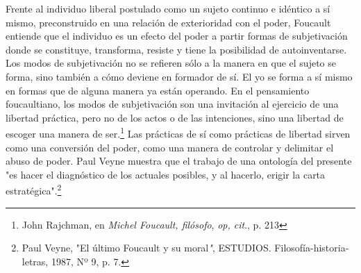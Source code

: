 \documentclass{book}
\begin{document}
Frente al individuo liberal postulado como un sujeto continuo e idéntico
a sí mismo, preconstruido en una relación de exterioridad con el poder,
Foucault entiende que el individuo es un efecto del poder a partir
formas de subjetivación donde se constituye, transforma, resiste y tiene
la posibilidad de autoinventarse. Los modos de subjetivación no se
refieren sólo a la manera en que el sujeto se forma, sino también a cómo
deviene en formador de sí. El yo se forma a sí mismo en formas que de
alguna manera ya están operando. En el pensamiento foucaultiano, los
modos de subjetivación son una invitación al ejercicio de una libertad
práctica, pero no de los actos o de las intenciones, sino una libertad
de escoger una manera de ser.\footnote{John Rajchman, en \emph{Michel
  Foucault, filósofo}, \emph{op, cit}., p. 213} Las prácticas de sí como
prácticas de libertad sirven como una conversión del poder, como una
manera de controlar y delimitar el abuso de poder. Paul Veyne muestra
que el trabajo de una ontología del presente "es hacer el diagnóstico de
los actuales posibles, y al hacerlo, erigir la carta
estratégica".\footnote{Paul Veyne, "El último Foucault y su
  moral\emph{"}, ESTUDIOS. Filosofía-historia-letras, 1987, Nº 9, p. 7.}
\end{document}
